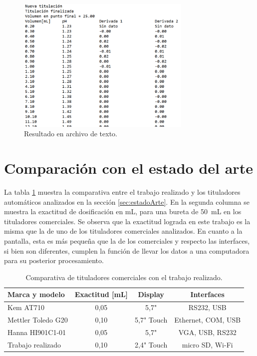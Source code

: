 \begin{figure}[htbp]
	\centering
	\includegraphics[width=0.742\textwidth]{./Figures/resultadoSD.png}
	\caption{Resultado en archivo de texto.}
	\label{fig:resultadoSD}
\end{figure}

\vspace{1,5 cm}

\section{Comparación con el estado del arte}

La tabla \ref{tab:titComparativa} muestra la comparativa entre el trabajo realizado y los tituladores automáticos analizados en la sección \ref{sec:estadoArte}. En la segunda columna se muestra la exactitud de dosificación en mL, para una bureta de 50~mL en los tituladores comerciales. Se observa que la exactitud lograda en este trabajo es la misma que la de uno de los tituladores comerciales analizados. En cuanto a la pantalla, esta es más pequeña que la de los comerciales y respecto las interfaces, si bien son diferentes, cumplen la función de llevar los datos a una computadora para su posterior procesamiento.

\begin{table}[h]
	\centering
	\caption[Comparativa con el trabajo realizado.]{Comparativa de tituladores comerciales con el trabajo realizado.}
	\begin{tabular}{l c c c }    
		\toprule
		\textbf{Marca y modelo} & \textbf{Exactitud [mL]}	&    \textbf{Display }&\textbf{Interfaces}  \\
		\midrule
		Kem AT710 		 	& 0,05 & 5,7" 		& RS232, USB \\		
		Mettler Toledo G20	& 0,10 & 5,7" Touch	& Ethernet, COM, USB \\
		Hanna HI901C1-01	 	& 0,05 & 5,7"		& VGA, USB, RS232 \\
		Trabajo realizado 	& 0,10 & 2,4" Touch	& micro SD, Wi-Fi \\
		\bottomrule
		\hline
	\end{tabular}
	\label{tab:titComparativa}
\end{table}